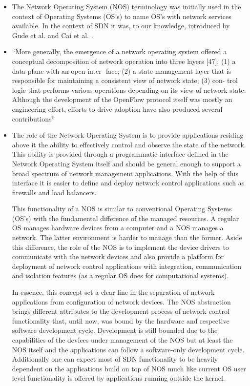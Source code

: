 \begin{itemize}
\begin{itemize}
\item The Network Operating System (NOS) terminology  was initially used in the
context of Operating Systems (OS's) to name OS's with network services available. In the
context of SDN it was, to our knowledge,
introduced by Gude et al. \cite{Gude:2008jd} and
Cai et al. \cite{Z.-Cai:2008fk}.

\item ``More generally, the emergence of a network operating system offered a conceptual decomposition of network operation into three layers [47]: (1) a data plane with an open inter- face; (2) a state management layer that is responsible for maintaining a consistent view of network state; (3) con- trol logic that performs various operations depending on its view of network state. Although the development of the OpenFlow protocol itself was mostly an engineering effort, efforts to drive adoption have also produced several contributions''

\item 
The role
of the Network Operating System is to provide
applications residing above it the ability to effectively control and
observe the state of the network. This ability is provided through a
programmatic interface defined in the Network Operating System itself and should be general
enough to support a broad spectrum of  network management
applications. With the help of this interface it is easier to define
and deploy network control applications such as firewalls and load
balancers. 

This functionality of a NOS is similar to conventional  Operating
Systems (OS's) with the fundamental difference of the managed resources. A
regular OS manages hardware devices from a computer 
and  a NOS manages a network.
The latter environment is harder to manage than the former. 
Aside this difference, the role of the NOS is to implement the
device drivers to communicate with the
network devices and also provide a platform for deployment of network
control applications with integration, communication and
isolation features (as a regular OS does for computational systems). 

In essence, this concept set a clear line in the separation of network applications
from configuration of network devices. The NOS abstraction brings different attributes to the development process of
network control functionality that, until now, was bound by the hardware and respective
software development cycle. Development is still bounded due to the
capabilities of the devices under management of the NOS but at least
the NOS itself and the applications can follow a software-only
development cycle. Additionally one can expect most of SDN functionality to be
heavily dependent   on the applications build on top of NOS much like
current  OS user level functionality is offered by applications
running outside the kernel.


\end{itemize}
\end{itemize}
